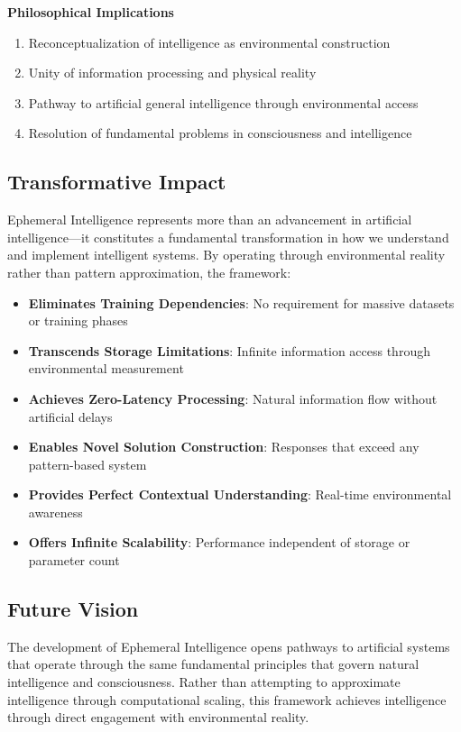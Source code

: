 \documentclass[12pt,a4paper]{article}
\begin{document}
\textbf{Philosophical Implications}
\begin{enumerate}
\item Reconceptualization of intelligence as environmental construction
\item Unity of information processing and physical reality
\item Pathway to artificial general intelligence through environmental access
\item Resolution of fundamental problems in consciousness and intelligence
\end{enumerate}

\subsection{Transformative Impact}

Ephemeral Intelligence represents more than an advancement in artificial intelligence—it constitutes a fundamental transformation in how we understand and implement intelligent systems. By operating through environmental reality rather than pattern approximation, the framework:

\begin{itemize}
\item \textbf{Eliminates Training Dependencies}: No requirement for massive datasets or training phases
\item \textbf{Transcends Storage Limitations}: Infinite information access through environmental measurement
\item \textbf{Achieves Zero-Latency Processing}: Natural information flow without artificial delays
\item \textbf{Enables Novel Solution Construction}: Responses that exceed any pattern-based system
\item \textbf{Provides Perfect Contextual Understanding}: Real-time environmental awareness
\item \textbf{Offers Infinite Scalability}: Performance independent of storage or parameter count
\end{itemize}

\subsection{Future Vision}

The development of Ephemeral Intelligence opens pathways to artificial systems that operate through the same fundamental principles that govern natural intelligence and consciousness. Rather than attempting to approximate intelligence through computational scaling, this framework achieves intelligence through direct engagement with environmental reality.
\end{document}

